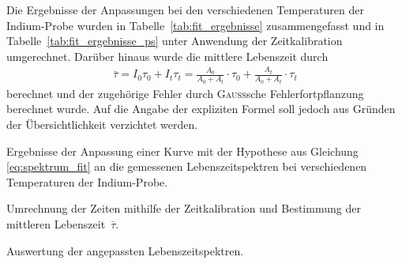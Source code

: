 \documentclass[11pt, a4paper]{article}
\numberwithin{equation}{section}
\begin{document}
Die Ergebnisse der Anpassungen bei den verschiedenen Temperaturen der Indium-Probe wurden in Tabelle~\ref{tab:fit_ergebnisse} zusammengefasst und in Tabelle~\ref{tab:fit_ergebnisse_ps} unter Anwendung der Zeitkalibration umgerechnet.
Darüber hinaus wurde die mittlere Lebenszeit durch
\begin{align*}
	\bar{\tau} = I_0 \tau_0 + I_t \tau_t = \frac{A_0}{A_0 + A_t} \cdot \tau_0 + \frac{A_t}{A_0 + A_t} \cdot \tau_t
\end{align*}
berechnet \cite{add_infos} und der zugehörige Fehler durch \textsc{Gauß}sche Fehlerfortpflanzung berechnet wurde.
Auf die Angabe der expliziten Formel soll jedoch aus Gründen der Übersichtlichkeit verzichtet werden.
\begin{table}
	\begin{subtable}{\textwidth}
		\centering
		\resizebox{\textwidth}{!}{
			
		}
		\caption{Ergebnisse der Anpassung einer Kurve mit der Hypothese aus Gleichung \eqref{eq:spektrum_fit} an die gemessenen Lebenszeitspektren bei verschiedenen Temperaturen der Indium-Probe.}
		\label{tab:fit_ergebnisse}
		\vspace*{0.8cm}
	\end{subtable}
	\begin{subtable}{\textwidth}
		\centering
		
		\caption{Umrechnung der Zeiten mithilfe der Zeitkalibration und Bestimmung der mittleren Lebenszeit~$\bar{\tau}$.}
		\label{tab:fit_ergebnisse_ps}
		\vspace*{0.5cm}
	\end{subtable}
	\caption{Auswertung der angepassten Lebenszeitspektren.}
\end{table}
\end{document}
